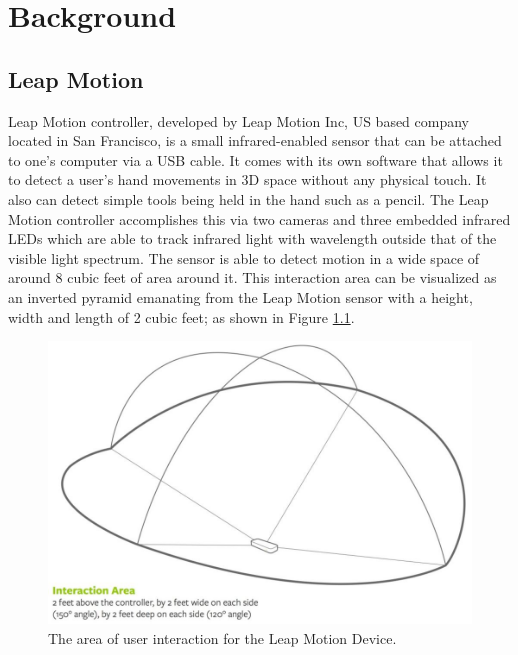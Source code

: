 \chapter{Background}

\label{Chapter1} 

\section{Leap Motion}
Leap Motion controller, developed by Leap Motion Inc, US based company located in San Francisco, is a small infrared-enabled sensor that can be attached to one’s computer via a USB cable. It comes with its own software that allows it to detect a user’s hand movements in 3D space without any physical touch. It also can detect simple tools being held in the hand such as a pencil. The Leap Motion controller accomplishes this via two cameras and three embedded infrared LEDs which are able to track infrared light with wavelength outside that of the visible light spectrum. The sensor is able to detect motion in a wide space of around 8 cubic feet of area around it. This interaction area can be visualized as an inverted pyramid emanating from the Leap Motion sensor with a height, width and length of 2 cubic feet; as shown in Figure \ref{fig:LeapInteractionArea}.
\begin{figure}[th]
\centering
\includegraphics[scale=0.35]{Figures/LeapInteractionArea.JPG}
\caption[Leap Motion interaction area]{The area of user interaction for the Leap Motion Device.}
\label{fig:LeapInteractionArea}
\end{figure}

